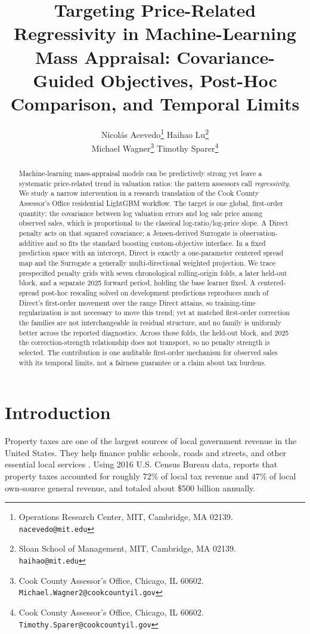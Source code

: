 \documentclass[10pt]{article}
\title{Targeting Price-Related Regressivity in Machine-Learning Mass Appraisal:
Covariance-Guided Objectives, Post-Hoc Comparison, and Temporal Limits}
\author{
Nicol\'as Acevedo\thanks{Operations Research Center, MIT, Cambridge, MA 02139. \texttt{nacevedo@mit.edu}}
\qquad
Haihao Lu\thanks{Sloan School of Management, MIT, Cambridge, MA 02139. \texttt{haihao@mit.edu}}
\\[1ex]
Michael Wagner\thanks{Cook County Assessor's Office, Chicago, IL 60602. \texttt{Michael.Wagner2@cookcountyil.gov}}
\qquad
Timothy Sparer\thanks{Cook County Assessor's Office, Chicago, IL 60602. \texttt{Timothy.Sparer@cookcountyil.gov}}
}
\date{}
\theoremstyle{definition}
\newcommand{\1}{\mathbf{1}}
\begin{document}
\maketitle


\begin{abstract}

Machine-learning mass-appraisal models can be predictively strong yet leave a systematic
price-related trend in valuation ratios: the pattern assessors call \emph{regressivity}. We
study a narrow intervention in a research translation of the Cook County Assessor's Office
residential LightGBM workflow. The target is one global, first-order quantity: the covariance
between log valuation errors and log sale price among observed sales, which is
proportional to the classical log-ratio/log-price slope. A Direct penalty acts on that squared covariance; a Jensen-derived
Surrogate is observation-additive and so fits the standard boosting custom-objective interface.
In a fixed prediction space with an intercept, Direct is exactly a one-parameter centered spread
map and the Surrogate a generally multi-directional weighted projection. We trace prespecified penalty grids with
seven chronological rolling-origin folds, a later held-out block, and a separate 2025
forward period, holding the base learner fixed. A centered-spread post-hoc rescaling
solved on development predictions reproduces much of Direct's first-order movement over the
range Direct attains, so training-time regularization is not necessary to move this trend; yet
at matched first-order correction the families are not interchangeable in residual structure,
and no family is uniformly better across the reported diagnostics. Across those folds, the held-out block, and 2025 the correction-strength
relationship does not transport, so no penalty strength is selected. The contribution is one
auditable first-order mechanism for observed sales with its temporal limits, not a fairness
guarantee or a claim about tax burdens.

\end{abstract}


\section{Introduction}
\label{sec:introduction}

Property taxes are one of the largest sources of local government revenue in the United States. They help finance public schools, roads and streets, and other essential local services \cite{IAAO2020PropertyTaxPolicy}. Using 2016 U.S. Census Bureau data, \textcite{Berry2021} reports that property taxes accounted for roughly 72\% of local tax revenue and 47\% of local own-source general revenue, and totaled about \$500 billion annually.
\end{document}
